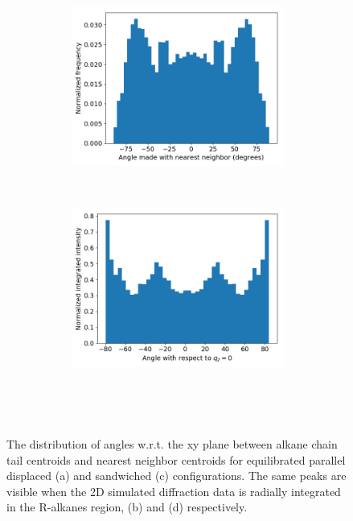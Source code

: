 \documentclass{article}
\begin{document}
\begin{figure}[!htb]
	\begin{subfigure}{\linewidth}
	\centering
		\begin{subfigure}{0.45\textwidth}
	        \centering
		        \includegraphics[width=\linewidth]{angles_traj_layered.png}
		        \caption{}~\label{fig:layered_tails}
		\end{subfigure}
		\begin{subfigure}{0.45\textwidth}
        	\centering
		        \includegraphics[width=\linewidth]{layered_angle_v_I.png}
		        \caption{}~\label{fig:layered_integration}
		\end{subfigure}
	\end{subfigure} 
  \caption{The distribution of angles w.r.t. the xy plane between alkane chain tail centroids and nearest
  neighbor centroids for equilibrated parallel displaced (a) and sandwiched (c) configurations. The
  same peaks are visible when the 2D simulated diffraction data is radially integrated in the R-alkanes region,
  (b) and (d) respectively.}~\label{fig:tail_packing}
  \end{figure}
\end{document}
